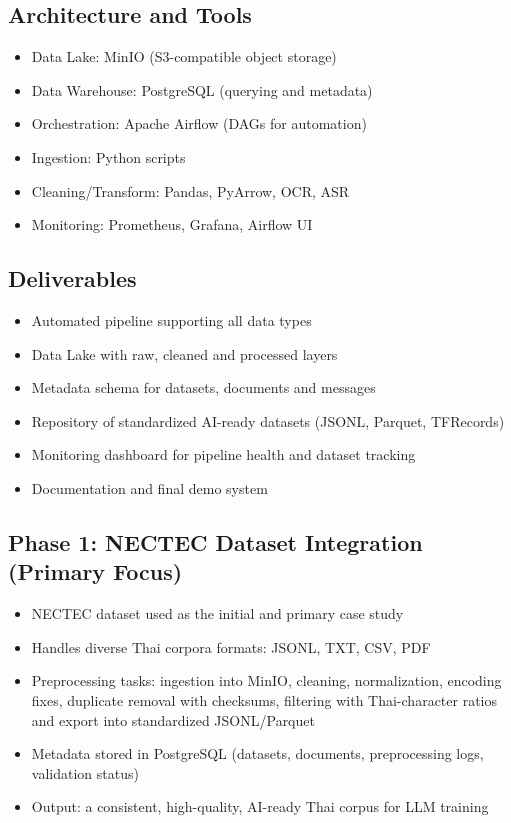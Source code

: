 \documentclass[12pt,oneside,openright,a4paper]{cpe-english-project}
\begin{document}
\subsection{Architecture and Tools}
\begin{itemize}
\item Data Lake: MinIO (S3-compatible object storage)
\item Data Warehouse: PostgreSQL (querying and metadata)
\item Orchestration: Apache Airflow (DAGs for automation)
\item Ingestion: Python scripts
\item Cleaning/Transform: Pandas, PyArrow, OCR, ASR
\item Monitoring: Prometheus, Grafana, Airflow UI
\end{itemize}

\subsection{Deliverables}
\begin{itemize}
\item Automated pipeline supporting all data types
\item Data Lake with raw, cleaned and processed layers
\item Metadata schema for datasets, documents and messages
\item Repository of standardized AI-ready datasets (JSONL, Parquet, TFRecords)
\item Monitoring dashboard for pipeline health and dataset tracking
\item Documentation and final demo system
\end{itemize}

\subsection{Phase 1: NECTEC Dataset Integration (Primary Focus)}
\begin{itemize}
\item NECTEC dataset used as the initial and primary case study
\item Handles diverse Thai corpora formats: JSONL, TXT, CSV, PDF
\item Preprocessing tasks: ingestion into MinIO, cleaning, normalization, encoding fixes, duplicate removal with checksums, filtering with Thai-character ratios and export into standardized JSONL/Parquet
\item Metadata stored in PostgreSQL (datasets, documents, preprocessing logs, validation status)
\item Output: a consistent, high-quality, AI-ready Thai corpus for LLM training
\end{itemize}
\end{document}
